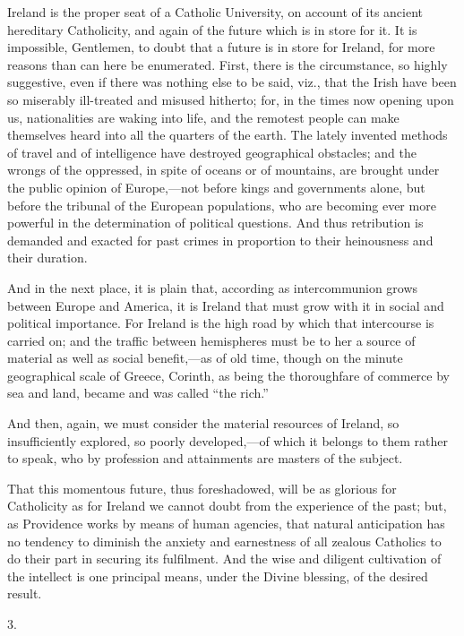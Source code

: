 Ireland is the proper seat of a Catholic University, on account of
its ancient hereditary Catholicity, and again of the future which is
in store for it. It is impossible, Gentlemen, to doubt that a future
is in store for Ireland, for more reasons than can here be enumerated.
First, there is the circumstance, so highly suggestive, even if there
was nothing else to be said, viz., that the Irish have been so
miserably ill-treated and misused hitherto; for, in the times now
opening upon us, nationalities are waking into life, and the remotest
people can make themselves heard into all the quarters of the earth.
The lately invented methods of travel and of intelligence have
destroyed geographical obstacles; and the wrongs of the oppressed, in
spite of oceans or of mountains, are brought under the public opinion
of Europe,—not before kings and governments alone, but before the
tribunal of the European populations, who are becoming ever more
powerful in the determination of political questions. And thus
retribution is demanded and exacted for past crimes in proportion to
their heinousness and their duration.

And in the next place, it is plain that, according as
intercommunion grows between Europe and America, it is Ireland that
must grow with it in social and political importance. For Ireland is
the high road by which that intercourse is carried on; and the traffic
between hemispheres must be to her a source of material as well as
social benefit,—as of old time, though on the minute geographical
scale of Greece, Corinth, as being the thoroughfare of commerce
by sea and land, became and was called ``the rich.''

And then, again, we must consider the material resources of
Ireland, so insufficiently explored, so poorly developed,—of which
it belongs to them rather to speak, who by profession and attainments
are masters of the subject.

That this momentous future, thus foreshadowed, will be as glorious
for Catholicity as for Ireland we cannot doubt from the experience of
the past; but, as Providence works by means of human agencies, that
natural anticipation has no tendency to diminish the anxiety and
earnestness of all zealous Catholics to do their part in securing its
fulfilment. And the wise and diligent cultivation of the intellect is
one principal means, under the Divine blessing, of the desired result.

3.

